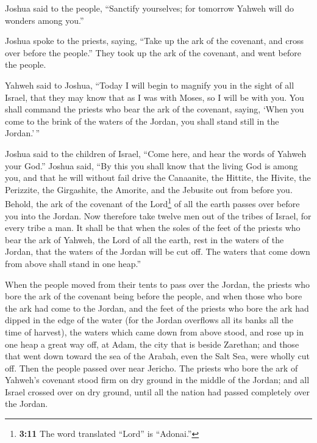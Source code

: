  Joshua said to the people, ``Sanctify yourselves; for
tomorrow Yahweh will do wonders among you.''

 Joshua spoke to the priests, saying, ``Take up the ark of
the covenant, and cross over before the people.'' They took up the ark
of the covenant, and went before the people.

 Yahweh said to Joshua, ``Today I will begin to magnify
you in the sight of all Israel, that they may know that as I was with
Moses, so I will be with you.  You shall command the
priests who bear the ark of the covenant, saying, `When you come to the
brink of the waters of the Jordan, you shall stand still in the
Jordan.'\,''

 Joshua said to the children of Israel, ``Come here, and
hear the words of Yahweh your God.''  Joshua said, ``By
this you shall know that the living God is among you, and that he will
without fail drive the Canaanite, the Hittite, the Hivite, the
Perizzite, the Girgashite, the Amorite, and the Jebusite out from before
you.  Behold, the ark of the covenant of the
Lord\footnote{\textbf{3:11} The word translated ``Lord'' is ``Adonai.''}
of all the earth passes over before you into the Jordan. 
Now therefore take twelve men out of the tribes of Israel, for every
tribe a man.  It shall be that when the soles of the feet
of the priests who bear the ark of Yahweh, the Lord of all the earth,
rest in the waters of the Jordan, that the waters of the Jordan will be
cut off. The waters that come down from above shall stand in one heap.''

 When the people moved from their tents to pass over the
Jordan, the priests who bore the ark of the covenant being before the
people,  and when those who bore the ark had come to the
Jordan, and the feet of the priests who bore the ark had dipped in the
edge of the water (for the Jordan overflows all its banks all the time
of harvest),  the waters which came down from above
stood, and rose up in one heap a great way off, at Adam, the city that
is beside Zarethan; and those that went down toward the sea of the
Arabah, even the Salt Sea, were wholly cut off. Then the people passed
over near Jericho.  The priests who bore the ark of
Yahweh's covenant stood firm on dry ground in the middle of the Jordan;
and all Israel crossed over on dry ground, until all the nation had
passed completely over the Jordan.

